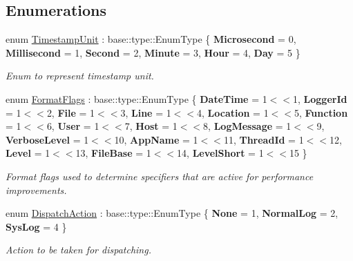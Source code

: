 \subsection*{Enumerations}
\begin{DoxyCompactItemize}
\item 
\mbox{\label{namespaceel_1_1base_a1b886858c6409097395b24b1bdf03c39}} 
enum \hyperlink{namespaceel_1_1base_a1b886858c6409097395b24b1bdf03c39}{Timestamp\+Unit} \+: base\+::type\+::\+Enum\+Type \{ \newline
{\bfseries Microsecond} = 0, 
{\bfseries Millisecond} = 1, 
{\bfseries Second} = 2, 
{\bfseries Minute} = 3, 
\newline
{\bfseries Hour} = 4, 
{\bfseries Day} = 5
 \}\begin{DoxyCompactList}\small\item\em Enum to represent timestamp unit. \end{DoxyCompactList}
\item 
\mbox{\label{namespaceel_1_1base_a28939c5a884e67fcf12259f4b8848e00}} 
enum \hyperlink{namespaceel_1_1base_a28939c5a884e67fcf12259f4b8848e00}{Format\+Flags} \+: base\+::type\+::\+Enum\+Type \{ \newline
{\bfseries Date\+Time} = 1$<$$<$1, 
{\bfseries Logger\+Id} = 1$<$$<$2, 
{\bfseries File} = 1$<$$<$3, 
{\bfseries Line} = 1$<$$<$4, 
\newline
{\bfseries Location} = 1$<$$<$5, 
{\bfseries Function} = 1$<$$<$6, 
{\bfseries User} = 1$<$$<$7, 
{\bfseries Host} = 1$<$$<$8, 
\newline
{\bfseries Log\+Message} = 1$<$$<$9, 
{\bfseries Verbose\+Level} = 1$<$$<$10, 
{\bfseries App\+Name} = 1$<$$<$11, 
{\bfseries Thread\+Id} = 1$<$$<$12, 
\newline
{\bfseries Level} = 1$<$$<$13, 
{\bfseries File\+Base} = 1$<$$<$14, 
{\bfseries Level\+Short} = 1$<$$<$15
 \}\begin{DoxyCompactList}\small\item\em Format flags used to determine specifiers that are active for performance improvements. \end{DoxyCompactList}
\item 
\mbox{\label{namespaceel_1_1base_a3aa2563d38e47388ba242a1694fc2839}} 
enum \hyperlink{namespaceel_1_1base_a3aa2563d38e47388ba242a1694fc2839}{Dispatch\+Action} \+: base\+::type\+::\+Enum\+Type \{ {\bfseries None} = 1, 
{\bfseries Normal\+Log} = 2, 
{\bfseries Sys\+Log} = 4
 \}\begin{DoxyCompactList}\small\item\em Action to be taken for dispatching. \end{DoxyCompactList}
\end{DoxyCompactItemize}
